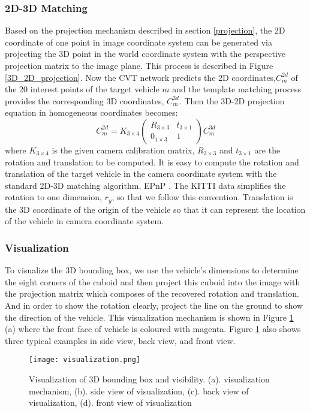 \subsubsection{2D-3D Matching}

Based on the projection mechanism described in section \ref{projection}, the 2D coordinate of one point in image coordinate system can be generated via projecting the 3D point in the world coordinate system with the perspective projection matrix to the image plane. This process is described in Figure \ref{3D_2D_projection}. Now the CVT network predicts the 2D coordinates,$C_m^{2d}$ of the 20 interest points of the target vehicle $m$ and the template matching process provides the corresponding 3D coordinates, $C_m^{3d}$. Then the 3D-2D projection equation in homogeneous coordinates becomes:
\begin{equation}
	C_m^{2d} =   K_{3\times 4}
	\begin{pmatrix}
	R_{3\times 3} & t_{3\times 1}\\ 
	0_{1\times 3}& 1
	\end{pmatrix} C_m^{3d}
\end{equation}
where $K_{3\times 4}$ is the given camera calibration matrix, $R_{3\times 3}$ and $t_{3\times 1}$ are the rotation and translation to be computed. It is easy to compute the rotation and translation of the target vehicle in the camera coordinate system with the standard 2D-3D matching algorithm, EPnP \cite{Lepetit2008}. The KITTI data simplifies the rotation to one dimension, $r_y$, so that we follow this convention. Translation is the 3D coordinate of the origin of the vehicle so that it can represent the location of the vehicle in camera coordinate system.


\subsubsection{Visualization}
To visualize the 3D bounding box, we use the vehicle's dimensions to determine the eight corners of the cuboid and then project this cuboid into the image with the projection matrix which composes of the recovered rotation and translation. And in order to show the rotation clearly, project the line on the ground to show the direction of the vehicle. This visualization mechanism is shown in Figure \ref{figure:visualization} (a) where the front face of vehicle is coloured with magenta. Figure \ref{figure:visualization} also shows three typical examples in side view, back view, and front view.

\begin{figure}[h]		
	\texttt{[image: visualization.png]}
	\caption{Visualization of 3D bounding box and visibility. (a). visualization mechanism, (b). side view of visualization, (c). back view of visualization, (d). front view of visualization}
	\centering
	\label{figure:visualization}
\end{figure}





